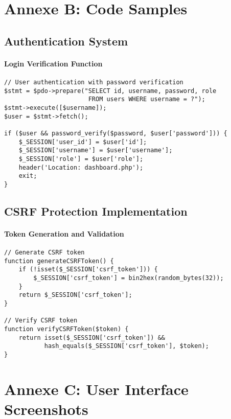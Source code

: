 \begin{center}
\section{Annexe B: Code Samples}
\label{sec:code-samples}

\subsection{Authentication System}

\paragraph{Login Verification Function}
\begin{verbatim}
// User authentication with password verification
$stmt = $pdo->prepare("SELECT id, username, password, role 
                       FROM users WHERE username = ?");
$stmt->execute([$username]);
$user = $stmt->fetch();

if ($user && password_verify($password, $user['password'])) {
    $_SESSION['user_id'] = $user['id'];
    $_SESSION['username'] = $user['username'];
    $_SESSION['role'] = $user['role'];
    header('Location: dashboard.php');
    exit;
}
\end{verbatim}

\subsection{CSRF Protection Implementation}

\paragraph{Token Generation and Validation}
\begin{verbatim}
// Generate CSRF token
function generateCSRFToken() {
    if (!isset($_SESSION['csrf_token'])) {
        $_SESSION['csrf_token'] = bin2hex(random_bytes(32));
    }
    return $_SESSION['csrf_token'];
}

// Verify CSRF token
function verifyCSRFToken($token) {
    return isset($_SESSION['csrf_token']) && 
           hash_equals($_SESSION['csrf_token'], $token);
}
\end{verbatim}

\section{Annexe C: User Interface Screenshots}
\label{sec:ui-screenshots}


\end{center}
